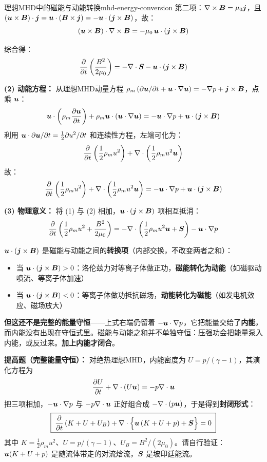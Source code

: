 \begin{example}{理想MHD中的磁能与动能转换}{mhd-energy-conversion}
第二项：$\nabla\times\bm{B} = \mu_0\bm{j}$，且 $(\bm{u}\times\bm{B})\cdot\bm{j} = \bm{u}\cdot(\bm{B}\times\bm{j}) = -\bm{u}\cdot(\bm{j}\times\bm{B})$，故：
\[
(\bm{u}\times\bm{B})\cdot\nabla\times\bm{B} = -\mu_0\,\bm{u}\cdot(\bm{j}\times\bm{B})
\]

综合得：
\[
\frac{\partial}{\partial t}\left(\frac{B^2}{2\mu_0}\right) = -\nabla\cdot\bm{S} - \bm{u}\cdot(\bm{j}\times\bm{B})
\]

\textbf{(2) 动能方程：}
从理想MHD动量方程 $\rho_m\left(\partial\bm{u}/\partial t + \bm{u}\cdot\nabla\bm{u}\right) = -\nabla p + \bm{j}\times\bm{B}$，点乘 $\bm{u}$：
\[
\bm{u}\cdot\left(\rho_m\frac{\partial\bm{u}}{\partial t}\right) + \rho_m\bm{u}\cdot(\bm{u}\cdot\nabla\bm{u}) = -\bm{u}\cdot\nabla p + \bm{u}\cdot(\bm{j}\times\bm{B})
\]
利用 $\bm{u}\cdot\partial\bm{u}/\partial t = \frac{1}{2}\partial u^2/\partial t$ 和连续性方程，左端可化为：
\[
\frac{\partial}{\partial t}\left(\frac{1}{2}\rho_m u^2\right) + \nabla\cdot\left(\frac{1}{2}\rho_m u^2\bm{u}\right)
\]
故：
\[
\frac{\partial}{\partial t}\left(\frac{1}{2}\rho_m u^2\right) + \nabla\cdot\left(\frac{1}{2}\rho_m u^2\bm{u}\right) = -\bm{u}\cdot\nabla p + \bm{u}\cdot(\bm{j}\times\bm{B})
\]

\textbf{(3) 物理意义：}
将 (1) 与 (2) 相加，$\bm{u}\cdot(\bm{j}\times\bm{B})$ 项相互抵消：
\[
\frac{\partial}{\partial t}\left(\frac{1}{2}\rho_m u^2 + \frac{B^2}{2\mu_0}\right) = -\nabla\cdot\left(\frac{1}{2}\rho_m u^2\bm{u} + \bm{S}\right) - \bm{u}\cdot\nabla p
\]

$\bm{u}\cdot(\bm{j}\times\bm{B})$ 是磁能与动能之间的\textbf{转换项}（内部交换，不改变两者之和）：
\begin{itemize}[leftmargin=*,itemsep=0pt]
\item 当 $\bm{u}\cdot(\bm{j}\times\bm{B}) > 0$：洛伦兹力对等离子体做正功，\textbf{磁能转化为动能}（如磁驱动喷流、等离子体加速）
\item 当 $\bm{u}\cdot(\bm{j}\times\bm{B}) < 0$：等离子体做功抵抗磁场，\textbf{动能转化为磁能}（如发电机效应、磁场放大）
\end{itemize}

\textbf{但这还不是完整的能量守恒}——上式右端仍留着 $-\bm{u}\cdot\nabla p$，它把能量交给了\textbf{内能}，而内能没有出现在守恒式里。磁能与动能之和并不单独守恒：压强功会把能量泵入内能，或反过来。\textbf{加上内能才闭合}。

\textbf{提高题（完整能量守恒）：} 对绝热理想MHD，内能密度为 $U = p/(\gamma-1)$，其演化方程为
\[
\frac{\partial U}{\partial t} + \nabla\cdot(U\bm{u}) = -p\nabla\cdot\bm{u}
\]
把三项相加，$-\bm{u}\cdot\nabla p$ 与 $-p\nabla\cdot\bm{u}$ 正好组合成 $-\nabla\cdot(p\bm{u})$，于是得到\textbf{封闭形式}：
\[
\boxed{\;\frac{\partial}{\partial t}\left(K + U + U_B\right) + \nabla\cdot\Bigl\{\bm{u}\left(K + U + p\right) + \bm{S}\Bigr\} = 0\;}
\]
其中 $K=\tfrac12\rho_mu^2$、$U=p/(\gamma-1)$、$U_B=B^2/(2\mu_0)$。请自行验证：$\bm{u}(K+U+p)$ 是随流体带走的对流焓流，$\bm{S}$ 是坡印廷能流。


\end{example}
